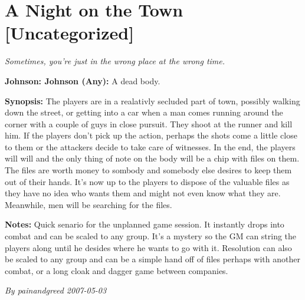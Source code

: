 \documentclass[letterpaper,twocolumn,10.5pt]{article}
\newenvironment{scenario}[6]
	{
		\section{#1 {\small[#2]}}
		\textit{#3}
		\def\TMPSCENARIO{#4 #5}
	}
	{\small\textit{By \TMPSCENARIO}}
\newcommand{\johnson}[2]{\textbf{Johnson: #1 (#2):}}
\newcommand{\synopsis}{\textbf{Synopsis: }}
\newcommand{\notes}{\textbf{Notes: }}
\begin{document}
\begin{scenario}{A Night on the Town}
	{Uncategorized}
	{ Sometimes, you're just in the wrong place at the wrong time.}
	{painandgreed}
	{2007-05-03}
	{https://forum.rpg.net/showthread.php?321504-Shadowrun-4th-101-Instant-Scenarios\&p=7250148#post7250148}

\johnson{Johnson}{Any} A dead body.

\synopsis  The players are in a realativly secluded part of town, possibly walking down the street, or getting into a car when a man comes running around the corner with a couple of guys in close pursuit. They shoot at the runner and kill him. If the players don't pick up the action, perhaps the shots come a little close to them or the attackers decide to take care of witnesses. In the end, the players will will and the only thing of note on the body will be a chip with files on them. The files are worth money to sombody and somebody else desires to keep them out of their hands. It's now up to the players to dispose of the valuable files as they have no idea who wants them and might not even know what they are. Meanwhile, men will be searching for the files.

\notes  Quick senario for the unplanned game session. It instantly drops into combat and can be scaled to any group. It's a mystery so the GM can string the players along until he desides where he wants to go with it. Resolution can also be scaled to any group and can be a simple hand off of files perhaps with another combat, or a long cloak and dagger game between companies.

\end{scenario}
\end{document}
